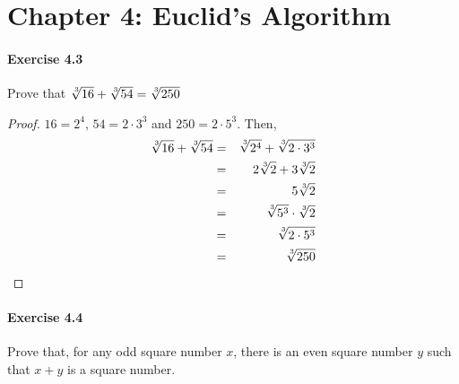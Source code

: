 \section*{Chapter 4: Euclid's Algorithm}

\paragraph{Exercise 4.3}
Prove that $\KthRoot{3}{16} + \KthRoot{3}{54} = \KthRoot{3}{250}$

\begin{proof}
$16 = 2^4$, $54 = 2 \cdot 3^3$ and $250 = 2 \cdot 5^3$. Then,
\begin{eqnarray*}
\KthRoot{3}{16} + \KthRoot{3}{54} &=& \KthRoot{3}{2^4} +
                                      \KthRoot{3}{2 \cdot 3^3} \\
                                  &=& 2 \KthRoot{3}{2} + 3 \KthRoot{3}{2} \\
                                  &=& 5 \KthRoot{3}{2} \\
                                  &=& \KthRoot{3}{5^3} \cdot \KthRoot{3}{2} \\
                                  &=& \KthRoot{3}{2 \cdot 5^3} \\
                                  &=& \KthRoot{3}{250}
\end{eqnarray*}
\end{proof}

\paragraph{Exercise 4.4}
Prove that, for any odd square number $x$, there is an even square number $y$
such that $x+y$ is a square number.

